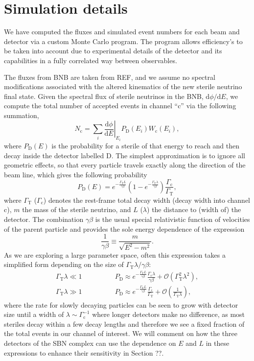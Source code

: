 \documentclass[11pt, a4paper]{article}
\begin{document}
\section{Simulation details}

We have computed the fluxes and simulated event numbers for each beam and
detector via a custom Monte Carlo program. The program allows efficiency's to
be taken into account due to experimental details of the detector and its
capabilities in a fully correlated way between observables. 

The fluxes from BNB are taken from REF, and we assume no spectral modifications
associated with the altered kinematics of the new sterile neutrino final state.
%
Given the spectral flux of sterile neutrinos in the BNB,
$\mathrm{d}\phi/\mathrm{d}E$, we compute the total number of accepted events in
channel ``$\text{c}$'' via the following summation,
%
\[ N_\text{c} = \sum_{i} \left .
\frac{\mathrm{d}\phi}{\mathrm{d}E}\right|_{E_i} P_\text{D}\left(E_i\right)
W_\text{c}\left(E_i\right),  \]
%
where $P_\text{D}(E)$ is the probability for a sterile of that energy to reach
and then decay inside the detector labelled $\text{D}$. The simplest
approximation is to ignore all geometric effects, so that every particle
travels exactly along the direction of the beam line, which gives the following
probability 
%
\[ P_\text{D}\left(E\right) = e^{-\frac{\Gamma_\text{T}L}{\gamma\beta}}\left(
1-
e^{-\frac{\Gamma_\text{T}\lambda}{\gamma\beta}}\right)\frac{\Gamma_\text{c}}{\Gamma_\text{T}},
\label{eq:prob}
\]
%
where $\Gamma_\text{T}$ ($\Gamma_\text{c}$) denotes the rest-frame total decay
width (decay width into channel $\text{c}$), $m$ the mass of the sterile
neutrino, and $L$ ($\lambda$) the distance to (width of) the detector. The
combination $\gamma\beta$ is the usual special relativistic function of
velocities of the parent particle and provides the sole energy dependence of
the expression
%
\[   \frac{1}{\gamma\beta} \equiv \frac{m}{\sqrt{E^2-m^2}}. \]
%
As we are exploring a large parameter space, often this expression takes a
simplified form depending on the size of $\Gamma_\text{T}\lambda/\gamma\beta$:
%
\begin{align*} 
%
\Gamma_\text{T}\lambda \ll 1\qquad&\qquad P_\text{D} \approx
e^{-\frac{\Gamma_\text{T}L}{\gamma\beta}}\frac{\Gamma_\text{c}\lambda}{\gamma\beta}
+ \mathcal{O}\left(\Gamma_\text{T}^2\lambda^2\right),\\ 
%
\Gamma_\text{T}\lambda \gg 1\qquad&\qquad P_\text{D} \approx
e^{-\frac{\Gamma_\text{T}L}{\gamma\beta}}\frac{\Gamma_\text{c}}{\Gamma_\text{T}}
+ \mathcal{O}\left(\frac{1}{\Gamma_\text{T}\lambda}\right), 
%
\end{align*}
%
where the rate for slowly decaying particles can be seen to grow with detector
size until a width of $\lambda\sim\Gamma_\text{c}^{-1}$ where longer detectors
make no difference, as most steriles decay within a few decay lengths and
therefore we see a fixed fraction of the total events in our channel of interest. 
We will comment on how the three detectors of the SBN complex can use the 
dependence on $E$ and $L$ in these expressions to enhance their sensitivity in 
Section ??.
\end{document}
